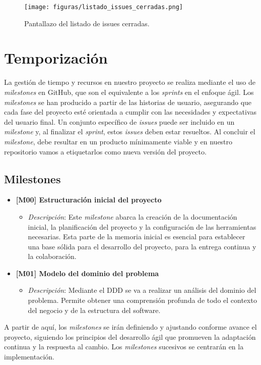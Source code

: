 \begin{figure}[H]
    \caption{Pantallazo del listado de issues cerradas.}
    \centering
    \vspace*{0.5cm}
    \texttt{[image: figuras/listado\_issues\_cerradas.png]}\label{fig:figuras/listado_issues_cerradas.png}
\end{figure}

\section{Temporización}

La gestión de tiempo y recursos en nuestro proyecto se realiza mediante el uso de \textit{milestones} en GitHub, que son el equivalente a los \textit{sprints} en el enfoque ágil. Los \textit{milestones} se han producido a partir de las historias de usuario, asegurando que cada fase del proyecto esté orientada a cumplir con las necesidades y expectativas del usuario final. Un conjunto específico de \textit{issues} puede ser incluido en un \textit{milestone} y, al finalizar el \textit{sprint}, estos \textit{issues} deben estar resueltos. Al concluir el \textit{milestone}, debe resultar en un producto mínimamente viable y en nuestro repositorio vamos a etiquetarlos como nueva versión del proyecto.

\subsection{Milestones}

\begin{itemize}
    \item \textbf{[M00] \- Estructuración inicial del proyecto}
    \begin{itemize}
        \item \textit{Descripción}: Este \textit{milestone} abarca la creación de la documentación inicial, la planificación del proyecto y la configuración de las herramientas necesarias. Esta parte de la memoria inicial es esencial para establecer una base sólida para el desarrollo del proyecto, para la entrega continua y la colaboración.
    \end{itemize}

    \item \textbf{[M01] \- Modelo del dominio del problema}
    \begin{itemize}
        \item \textit{Descripción}: Mediante el DDD se va a realizar un análisis del dominio del problema. Permite obtener una comprensión profunda de todo el contexto del negocio y de la estructura del software.
    \end{itemize}
\end{itemize}

A partir de aquí, los \textit{milestones} se irán definiendo y ajustando conforme avance el proyecto, siguiendo los principios del desarrollo ágil que promueven la adaptación continua y la respuesta al cambio. Los \textit{milestones} sucesivos se centrarán en la implementación.